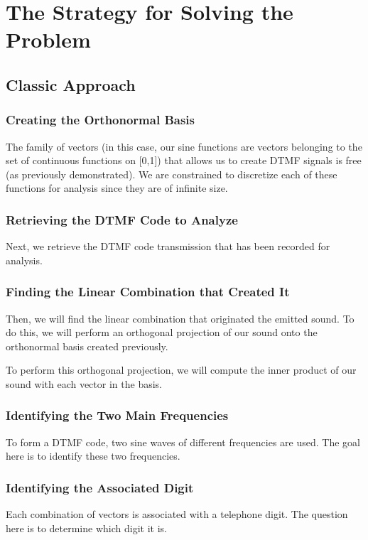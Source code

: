 \section{The Strategy for Solving the Problem}
\subsection{Classic Approach}
\subsubsection{Creating the Orthonormal Basis}
The family of vectors (in this case, our sine functions are vectors belonging to the set of continuous functions on [0,1]) that allows us to create DTMF signals is free (as previously demonstrated). We are constrained to discretize each of these functions for analysis since they are of infinite size.



\subsubsection{Retrieving the DTMF Code to Analyze}
Next, we retrieve the DTMF code transmission that has been recorded for analysis.



\subsubsection{Finding the Linear Combination that Created It}
Then, we will find the linear combination that originated the emitted sound. To do this, we will perform an orthogonal projection of our sound onto the orthonormal basis created previously.



To perform this orthogonal projection, we will compute the inner product of our sound with each vector in the basis.





\subsubsection{Identifying the Two Main Frequencies}
To form a DTMF code, two sine waves of different frequencies are used. The goal here is to identify these two frequencies.



\subsubsection{Identifying the Associated Digit}
Each combination of vectors is associated with a telephone digit. The question here is to determine which digit it is.


